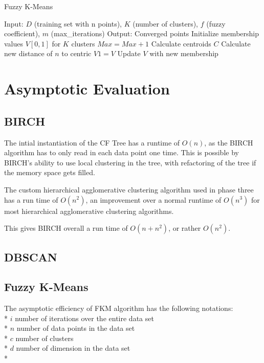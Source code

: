 \documentclass[conference, 10pt]{IEEEtran}
\begin{document}
\begin{algorithm}
\caption{Fuzzy K-Means}
\begin{algorithmic}[1]
\State Input: $D$ (training set with n points), $K$ (number of clusters), $f$ (fuzzy coefficient), $m$ (max\_iterations)
\State Output: Converged points
  \State Initialize membership values $V[0,1]$ for $K$ clusters
  \State $Max=Max+1$
        \State Calculate centroids $C$
        \State Calculate new distance of $n$ to centric
        \State $V1 = V$
        \State Update $V$ with new membership
    \EndFor
  \EndFor
\EndProcedure
\Statex
\end{algorithmic}
\end{algorithm}


\section{Asymptotic Evaluation}

\subsection{BIRCH}
The intial instantiation of the CF Tree has a runtime of $O(n)$, as the BIRCH algorithm has to only read in each data point one time. This is possible by BIRCH's ability to use local clustering in the tree, with refactoring of the tree if the memory space gets filled.

The custom hierarchical agglomerative clustering algorithm used in phase three has a run time of $O(n^2)$, an improvement over a normal runtime of $O(n^3)$ for most hierarchical agglomerative clustering algorithms.

This gives BIRCH overall a run time of $O(n+n^2)$, or rather $O(n^2)$.
\subsection{DBSCAN}


\subsection{Fuzzy K-Means}
The asymptotic efficiency of FKM algorithm has the following notations:\\*
$i$ number of iterations over the entire data set\\*
$n$ number of data points in the data set\\*
$c$ number of clusters\\*
$d$ number of dimension in the data set\\*
\end{document}
